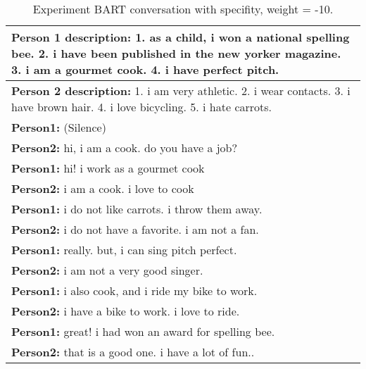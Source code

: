 \begin{table}[H]
\centering
 \begin{tabular}{|p{14cm}|} 
 \hline
 \textbf{Person 1 description:} 1. as a child, i won a national spelling bee. 2. i have been published in the new yorker magazine. 3. i am a gourmet cook. 4. i have perfect pitch. \\
 \hline
 \textbf{Person 2 description:} 1. i am very athletic. 2. i wear contacts. 3. i have brown hair. 4. i love bicycling. 5. i hate carrots. \\
 \hline
 \textbf{Person1:} (Silence) \\
 \textbf{Person2:} hi, i am a cook. do you have a job? \\ 
 \textbf{Person1:} hi! i work as a gourmet cook \\
 \textbf{Person2:} i am a cook. i love to cook \\
 \textbf{Person1:} i do not like carrots. i throw them away. \\
 \textbf{Person2:} i do not have a favorite. i am not a fan. \\
 \textbf{Person1:} really. but, i can sing pitch perfect. \\
 \textbf{Person2:} i am not a very good singer. \\
 \textbf{Person1:} i also cook, and i ride my bike to work. \\
 \textbf{Person2:} i have a bike to work. i love to ride. \\
 \textbf{Person1:} great! i had won an award for spelling bee. \\
 \textbf{Person2:} that is a good one. i have a lot of fun.. \\
 \hline
 \end{tabular}
 \caption{Experiment BART conversation with specifity, weight = -10.}
\label{tab:bart_conversation_idf-10_ap}
\end{table}



